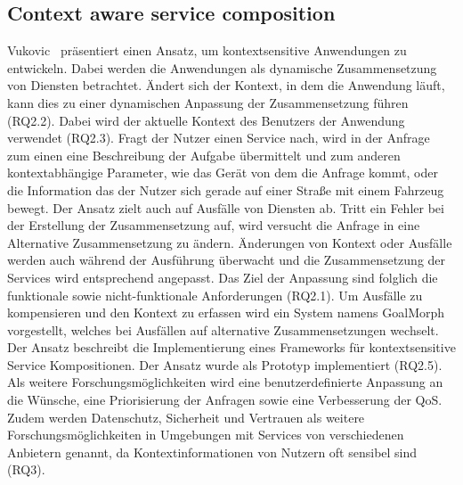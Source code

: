 \documentclass[conference,compsoc,ngerman]{IEEEtran}
\begin{document}
\subsection{Context aware service composition}
Vukovic~\cite{vukovic2007context} präsentiert einen Ansatz, um kontextsensitive Anwendungen zu entwickeln. Dabei werden die Anwendungen als dynamische Zusammensetzung von Diensten betrachtet. Ändert sich der Kontext, in dem die Anwendung läuft, kann dies zu einer dynamischen Anpassung der Zusammensetzung führen (RQ2.2). Dabei wird der aktuelle Kontext des Benutzers der Anwendung verwendet (RQ2.3). Fragt der Nutzer einen Service nach, wird in der Anfrage zum einen eine Beschreibung der Aufgabe übermittelt und zum anderen kontextabhängige Parameter, wie das Gerät von dem die Anfrage kommt, oder die Information das der Nutzer sich gerade auf einer Straße mit einem Fahrzeug bewegt.
Der Ansatz zielt auch auf Ausfälle von Diensten ab. Tritt ein Fehler bei der Erstellung der Zusammensetzung auf, wird versucht die Anfrage in eine Alternative Zusammensetzung zu ändern.
Änderungen von Kontext oder Ausfälle werden auch während der Ausführung überwacht und die Zusammensetzung der Services wird entsprechend angepasst.
Das Ziel der Anpassung sind folglich die funktionale sowie nicht-funktionale Anforderungen (RQ2.1).
Um Ausfälle zu kompensieren und den Kontext zu erfassen wird ein System namens GoalMorph vorgestellt, welches bei Ausfällen auf alternative Zusammensetzungen wechselt. Der Ansatz beschreibt die Implementierung eines Frameworks für kontextsensitive Service Kompositionen. Der Ansatz wurde als Prototyp implementiert (RQ2.5).
Als weitere Forschungsmöglichkeiten wird eine benutzerdefinierte Anpassung an die Wünsche, eine Priorisierung der Anfragen sowie eine Verbesserung der QoS. Zudem werden Datenschutz, Sicherheit und Vertrauen als weitere Forschungsmöglichkeiten in Umgebungen mit Services von verschiedenen Anbietern genannt, da Kontextinformationen von Nutzern oft sensibel sind (RQ3).
\end{document}
